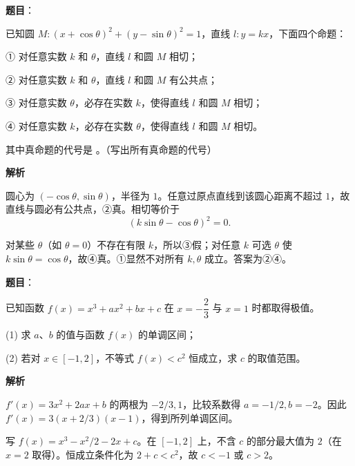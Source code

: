 \begin{answer}

\textbf{题目}：

已知圆 $M:(x+\cos\theta)^2+(y-\sin\theta)^2=1$，直线 $l:y=kx$，下面四个命题：

① 对任意实数 $k$ 和 $\theta$，直线 $l$ 和圆 $M$ 相切；

② 对任意实数 $k$ 和 $\theta$，直线 $l$ 和圆 $M$ 有公共点；

③ 对任意实数 $\theta$，必存在实数 $k$，使得直线 $l$ 和圆 $M$ 相切；

④ 对任意实数 $k$，必存在实数 $\theta$，使得直线 $l$ 和圆 $M$ 相切。

其中真命题的代号是 \gkblank{}。（写出所有真命题的代号）

\textbf{解析}

圆心为 $(-\cos\theta,\sin\theta)$，半径为 $1$。任意过原点直线到该圆心距离不超过 $1$，故直线与圆必有公共点，②真。相切等价于
\nopagebreak[4]
\[
(k\sin\theta-\cos\theta)^2=0.
\]

对某些 $\theta$（如 $\theta=0$）不存在有限 $k$，所以③假；对任意 $k$ 可选 $\theta$ 使 $k\sin\theta=\cos\theta$，故④真。①显然不对所有 $k,\theta$ 成立。答案为②④。


\end{answer}
\begin{answer}

\textbf{题目}：

已知函数 $f(x)=x^3+ax^2+bx+c$ 在 $x=-\dfrac23$ 与 $x=1$ 时都取得极值。

(1) 求 $a\text{、}b$ 的值与函数 $f(x)$ 的单调区间；

(2) 若对 $x\in[-1,2]$，不等式 $f(x)<c^2$ 恒成立，求 $c$ 的取值范围。

\textbf{解析}


$f'(x)=3x^2+2ax+b$ 的两根为 $-2/3,1$，比较系数得 $a=-1/2,b=-2$。因此 $f'(x)=3(x+2/3)(x-1)$，得到所列单调区间。


写 $f(x)=x^3-x^2/2-2x+c$。在 $[-1,2]$ 上，不含 $c$ 的部分最大值为 $2$（在 $x=2$ 取得）。恒成立条件化为 $2+c<c^2$，故 $c<-1$ 或 $c>2$。



\end{answer}
